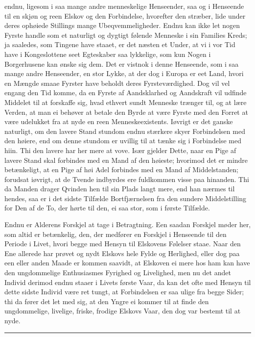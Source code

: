 \documentclass[12pt,a4paper]{book}
\newcommand{\apage}[1]{\marginnote{\footnotesize\textit{[#1]}}}
\begin{document}
endnu, ligesom i saa mange andre menneskelige Henseender, saa og i
Henseende til en skjøn og reen Elskov og den Forbindelse, hvorefter den
stræber, lide under deres ophøiede Stillings mange Ubeqvemmeligheder.
Endnu kan ikke let nogen Fyrste handle som et naturligt og dygtigt
følende Menneske i sin Families Kreds; ja saaledes, som Tingene have
staaet, er det næsten et Under, at vi i vor Tid have i Kongeslottene
seet Egteskaber saa lykkelige, som kun Nogen i Borgerhusene kan ønske
sig dem. Det er vistnok i denne Henseende, som i saa mange andre
Henseender, en stor Lykke, at der dog i Europa er eet Land, hvori en
Mængde smaae Fyrster have beholdt deres Fyrsteværdighed. Dog vil vel
engang den Tid komme, da en Fyrste af Aandsklarhed og Aandskraft vil
udfinde Middelet til at forskaffe sig, hvad ethvert sundt Menneske
trænger til, og at lære Verden, at man ei behøver at betale den Byrde at
være Fyrste med den Forret at \apage{92} være udelukket fra at nyde en reen
Menneskeexistents. Iøvrigt er det ganske naturligt, om den lavere Stand
stundom endnu stærkere skyer Forbindelsen med den høiere, end om denne
stundom er uvillig til at tænke sig i Forbindelse med hiin. Thi den
lavere har her mere at vove. Især gjelder Dette, naar en Pige af lavere
Stand skal forbindes med en Mand af den høieste; hvorimod det er mindre
betænkeligt, at en Pige af høi Adel forbindes med en Mand af
Middelstanden; forudsat iøvrigt, at de Tvende indbyrdes ere fuldkommen
visse paa hinanden. Thi da Manden drager Qvinden hen til sin Plads langt
mere, end han nærmes til hendes, saa er i det sidste Tilfælde
Bortfjærnelsen fra den sundere Middelstilling for Den af de To, der
hørte til den, ei saa stor, som i første Tilfælde.

Endnu er Alderens Forskjel at tage i Betragtning. Een saadan Forskjel
møder her, som altid er betænkelig, den, der medfører en Forskjel i
Henseende til den Periode i Livet, hvori begge med Hensyn til Elskovens
Følelser staae. Naar den Ene allerede har prøvet og nydt Elskovs hele
Fylde og Herlighed, eller dog paa een eller anden Maade er kommen
saavidt, at Elskoven ei mere hos ham kan have den ungdommelige
Enthusiasmes Fyrighed og Livelighed, men nu det andet Individ derimod
endnu staaer i Livets første Vaar, da kan det ofte med Hensyn til dette
sidste Individ være ret tungt, at Forbindelsen er saa ulige fra begge
Sider; thi da fører det let med sig, at den Yngre ei kommer \apage{93} til at finde
den ungdommelige, livelige, friske, frodige Elskovs Vaar, den dog var
bestemt til at nyde.

\begin{center}\rule{0.28\linewidth}{0.4pt}\end{center}
\end{document}
